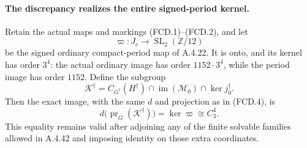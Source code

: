 \paragraph{The discrepancy realizes the entire signed-period kernel.}
Retain the actual maps and markings (FCD.1)--(FCD.2), and let
\[
 \varpi:J_c\longrightarrow\operatorname{SL}_2(\mathbb Z/12)
 \tag{CDF.1}
\]
be the signed ordinary compact-period map of A.4.22.
It is onto, and its kernel has order $3^4$: the actual
ordinary image has order $1152\cdot3^4$, while the
period image has order $1152$.
Define the subgroup
\[
 \mathcal K^\dagger=
 C_{G^\dagger}(H^\dagger)\cap
 \operatorname{im}(\mathcal M_0)\cap\ker j_0^\dagger.
 \tag{CDF.2}
\]
Then the exact image, with the same $d$ and projection as
in (FCD.4), is
\[
 d\bigl(\operatorname{pr}_G(\mathcal K^\dagger)\bigr)
       =\ker\varpi\cong C_3^4.
 \tag{CDF.3}
\]
This equality remains valid after adjoining any of the
finite solvable families allowed in A.4.42 and imposing
identity on those extra coordinates.

